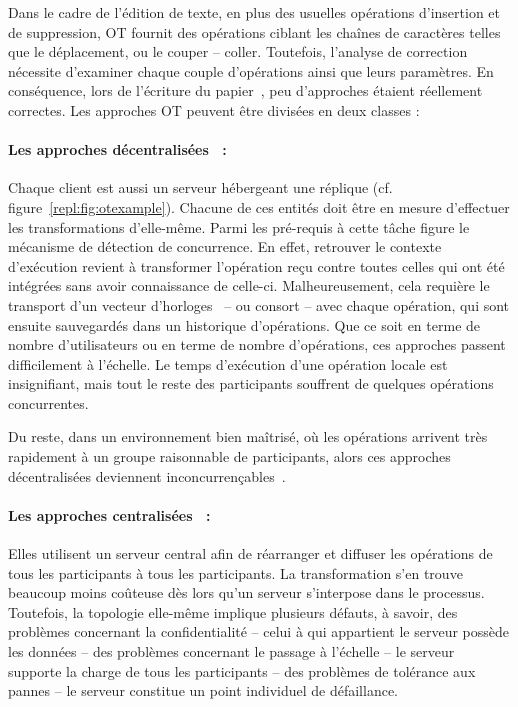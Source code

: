 Dans le cadre de l'édition de texte, en plus des usuelles opérations d'insertion
et de suppression, OT fournit des opérations ciblant les chaînes de caractères
telles que le déplacement, ou le couper -- coller. Toutefois, l'analyse de
correction nécessite d'examiner chaque couple d'opérations ainsi que leurs
paramètres. En conséquence, lors de l'écriture du
papier~\cite{imine2003proving}, peu d'approches étaient réellement correctes.
Les approches OT peuvent être divisées en deux classes :

\paragraph{Les approches décentralisées~\cite{sun2009contextbased} :}
Chaque client est aussi un serveur hébergeant une réplique
(cf. figure~\ref{repl:fig:otexample}). Chacune de ces entités doit être en
mesure d'effectuer les transformations d'elle-même. Parmi les pré-requis à cette
tâche figure le mécanisme de détection de concurrence. En effet, retrouver le
contexte d'exécution revient à transformer l'opération reçu contre toutes celles
qui ont été intégrées sans avoir connaissance de celle-ci. Malheureusement, cela
requière le transport d'un vecteur d'horloges~\cite{lamport1978time} -- ou
consort -- avec chaque opération, qui sont ensuite sauvegardés dans un
historique d'opérations. Que ce soit en terme de nombre d'utilisateurs ou en
terme de nombre d'opérations, ces approches passent difficilement à
l'échelle. Le temps d'exécution d'une opération locale est insignifiant, mais
tout le reste des participants souffrent de quelques opérations concurrentes.

\noindent Du reste, dans un environnement bien maîtrisé, où les opérations
arrivent très rapidement à un groupe raisonnable de participants, alors ces
approches décentralisées deviennent inconcurrençables~\cite{mehdi2014merging}.

\paragraph{Les approches centralisées~\cite{nichols1995high} :} Elles utilisent
un serveur central afin de réarranger et diffuser les opérations de tous les
participants à tous les participants. La transformation s'en trouve beaucoup
moins coûteuse dès lors qu'un serveur s'interpose dans le processus. Toutefois,
la topologie elle-même implique plusieurs défauts, à savoir, des problèmes
concernant la confidentialité -- celui à qui appartient le serveur possède les
données -- des problèmes concernant le passage à l'échelle -- le serveur
supporte la charge de tous les participants -- des problèmes de tolérance aux
pannes -- le serveur constitue un point individuel de défaillance.

